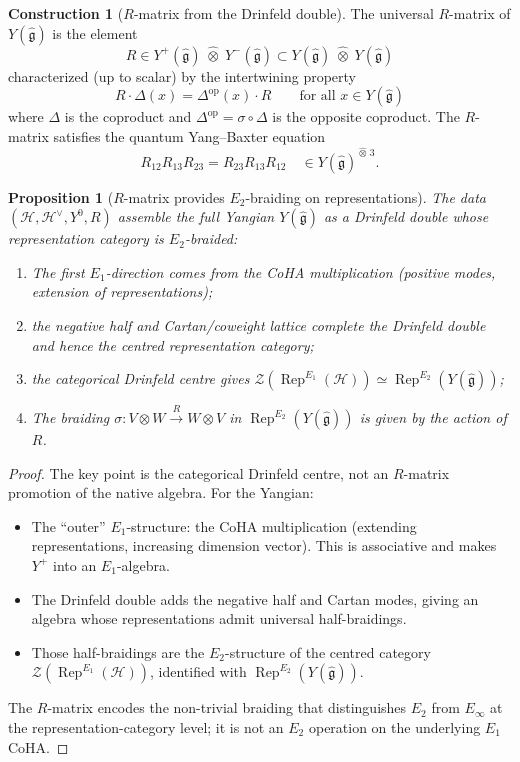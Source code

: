 \documentclass[11pt]{article}
\newtheorem{proposition}[theorem]{Proposition}
\theoremstyle{definition}
\newtheorem{construction}[theorem]{Construction}
\theoremstyle{remark}
\newcommand{\Rep}{\operatorname{Rep}}
\newcommand{\CoHA}{\mathcal{H}}
\newcommand{\cZ}{\mathcal{Z}}
\newcommand{\frakg}{\mathfrak{g}}
\newcommand{\op}{\operatorname{op}}
\begin{document}
\begin{construction}[$R$-matrix from the Drinfeld double]
\label{constr:r-matrix}
The universal $R$-matrix of $Y(\widehat{\frakg})$ is the element
\[
 R \in Y^+(\widehat{\frakg}) \;\widehat{\otimes}\;
 Y^-(\widehat{\frakg}) \subset
 Y(\widehat{\frakg}) \;\widehat{\otimes}\;
 Y(\widehat{\frakg})
\]
characterized (up to scalar) by the intertwining property
\[
 R \cdot \Delta(x) = \Delta^{\op}(x) \cdot R \qquad
 \text{for all } x \in Y(\widehat{\frakg})
\]
where $\Delta$ is the coproduct and $\Delta^{\op} = \sigma \circ \Delta$ is
the opposite coproduct. The $R$-matrix satisfies the quantum Yang--Baxter equation
\[
 R_{12} R_{13} R_{23} = R_{23} R_{13} R_{12}
 \quad \in Y(\widehat{\frakg})^{\widehat{\otimes}\, 3}.
\]
\end{construction}

\begin{proposition}[$R$-matrix provides $E_2$-braiding on representations]
\label{prop:r-matrix-e2}
The data $(\CoHA, \CoHA^{\vee}, Y^0, R)$ assemble the full Yangian
$Y(\widehat{\frakg})$ as a Drinfeld double whose representation category
is $E_2$-braided:
\begin{enumerate}[label=(\roman*)]
 \item The first $E_1$-direction comes from the CoHA multiplication
 (positive modes, extension of representations);
 \item the negative half and Cartan/coweight lattice complete the
 Drinfeld double and hence the centred representation category;
 \item the categorical Drinfeld centre gives
 $\cZ(\Rep^{E_1}(\CoHA)) \simeq \Rep^{E_2}(Y(\widehat{\frakg}))$;
 \item The braiding $\sigma \colon V \otimes W \xrightarrow{R}
 W \otimes V$ in $\Rep^{E_2}(Y(\widehat{\frakg}))$ is given by the
 action of $R$.
\end{enumerate}
\end{proposition}

\begin{proof}
The key point is the categorical Drinfeld centre, not an $R$-matrix
promotion of the native algebra. For the Yangian:
\begin{itemize}
 \item The ``outer'' $E_1$-structure: the CoHA multiplication (extending
 representations, increasing dimension vector). This is associative and
 makes $Y^+$ into an $E_1$-algebra.
 \item The Drinfeld double adds the negative half and Cartan modes,
 giving an algebra whose representations admit universal half-braidings.
 \item Those half-braidings are the $E_2$-structure of the centred
 category $\cZ(\Rep^{E_1}(\CoHA))$, identified with
 $\Rep^{E_2}(Y(\widehat{\frakg}))$.
\end{itemize}
The $R$-matrix encodes the non-trivial braiding that distinguishes $E_2$
from $E_{\infty}$ at the representation-category level; it is not an
$E_2$ operation on the underlying $E_1$ CoHA.
\end{proof}
\end{document}

